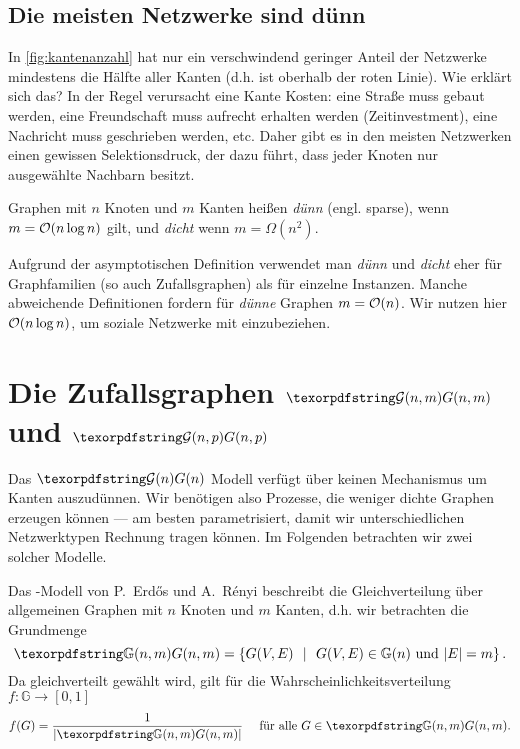 \subsection{Die meisten Netzwerke sind dünn}
In \cref{fig:kantenanzahl} hat nur ein verschwindend geringer Anteil der Netzwerke mindestens die Hälfte aller Kanten (d.h. ist oberhalb der roten Linie).
Wie erklärt sich das?
In der Regel verursacht eine Kante Kosten:
eine Straße muss gebaut werden, eine Freundschaft muss aufrecht erhalten werden (Zeitinvestment), eine Nachricht muss geschrieben werden, etc.
Daher gibt es in den meisten Netzwerken einen gewissen Selektionsdruck, der dazu führt, dass jeder Knoten nur ausgewählte Nachbarn besitzt.

\begin{definition}
    Graphen  mit $n$ Knoten und $m$ Kanten heißen \emph{dünn} (engl. sparse), wenn $m = \mathcal{O}\!\left(n \log n\right)$ gilt, und \emph{dicht} wenn $m = \Omega(n^2)$.
\end{definition}

\begin{remark}
    Aufgrund der asymptotischen Definition verwendet man \emph{dünn} und \emph{dicht} eher für Graphfamilien (so auch Zufallsgraphen) als für einzelne Instanzen.
    Manche abweichende Definitionen fordern für \emph{dünne} Graphen $m = \mathcal{O}\!\left(n\right)$.
    Wir nutzen hier $\mathcal{O}\!\left(n\log n\right)$, um soziale Netzwerke mit einzubeziehen.
\end{remark}

\section{Die Zufallsgraphen $\Gnm$ und $\Gnp$}
Das $\Gn$ Modell verfügt über keinen Mechanismus um Kanten auszudünnen.
Wir benötigen also Prozesse, die weniger dichte Graphen erzeugen können ---
am besten parametrisiert, damit wir unterschiedlichen Netzwerktypen Rechnung tragen können.
Im Folgenden betrachten wir zwei solcher Modelle.

Das \Gnm-Modell  von P.~Erd\H{o}s und A.~R\'enyi beschreibt die Gleichverteilung über allgemeinen Graphen mit $n$ Knoten und $m$ Kanten, d.h. wir betrachten die Grundmenge
\begin{equation}
    \gGnm = \twoset{G(V,E)}{G(V,E) \in \mathbb G(n) \text{ und } |E| = m}.
\end{equation}
Da gleichverteilt gewählt wird, gilt für die Wahrscheinlichkeitsverteilung~{$f\colon \mathbb G \to [0,1]$}
\begin{equation}
    f(G) = \frac{1}{| \gGnm |} \quad \text{ für alle } G \in \gGnm.
\end{equation}

